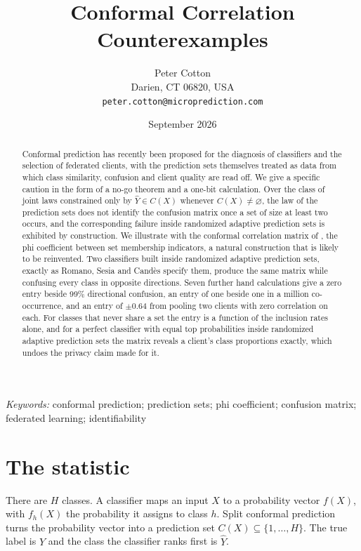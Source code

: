 \documentclass[11pt]{article}
\title{Conformal Correlation Counterexamples}
\author{Peter Cotton\\Darien, CT 06820, USA\\\texttt{peter.cotton@microprediction.com}}
\date{September 2026}
\theoremstyle{definition}
\theoremstyle{definition}
\theoremstyle{remark}
\newcommand{\set}[1]{\{#1\}}
\begin{document}
\maketitle

\begin{abstract}
Conformal prediction has recently been proposed for the diagnosis of classifiers and the selection
of federated clients, with the prediction sets themselves treated as data from which class
similarity, confusion and client quality are read off. We give a specific caution in the form of a no-go theorem and a one-bit calculation. Over the class of joint laws constrained only by $\hat Y \in C(X)$ whenever $C(X) \ne \varnothing$,
the law of the prediction sets does not identify the confusion matrix once a set of size at least two occurs,
and the corresponding failure inside randomized adaptive prediction sets is exhibited by
construction. We illustrate with
the conformal correlation matrix of \citet{perlo2026}, the phi coefficient between set membership
indicators, a natural construction that is likely to be reinvented. Two classifiers built inside randomized adaptive prediction sets, exactly as Romano, Sesia and
Cand\`es specify them, produce the same matrix while confusing every class in opposite directions. Seven further hand calculations give a zero entry beside
99\% directional confusion, an entry of one beside one in a million co-occurrence, and an entry of
$\pm 0.64$ from pooling two clients with zero correlation on each. For classes that never share a set the entry is a function of the inclusion rates alone, and for
a perfect classifier with equal top probabilities inside randomized adaptive prediction sets the
matrix reveals a client's class proportions exactly, which undoes the privacy claim made for it.
\end{abstract}

\noindent\textit{Keywords:} conformal prediction; prediction sets; phi coefficient; confusion matrix;
federated learning; identifiability

\section{The statistic}\label{sec:statistic}

There are $H$ classes. A classifier maps an input $X$ to a probability vector $f(X)$, with $f_h(X)$ the probability it assigns to class $h$. Split
conformal prediction \citep{vovk2005, lei2018} turns the probability vector into a prediction set
$C(X) \subseteq \set{1, \dots, H}$. The true label is $Y$ and the class the classifier ranks first is
$\hat Y$.
\end{document}
